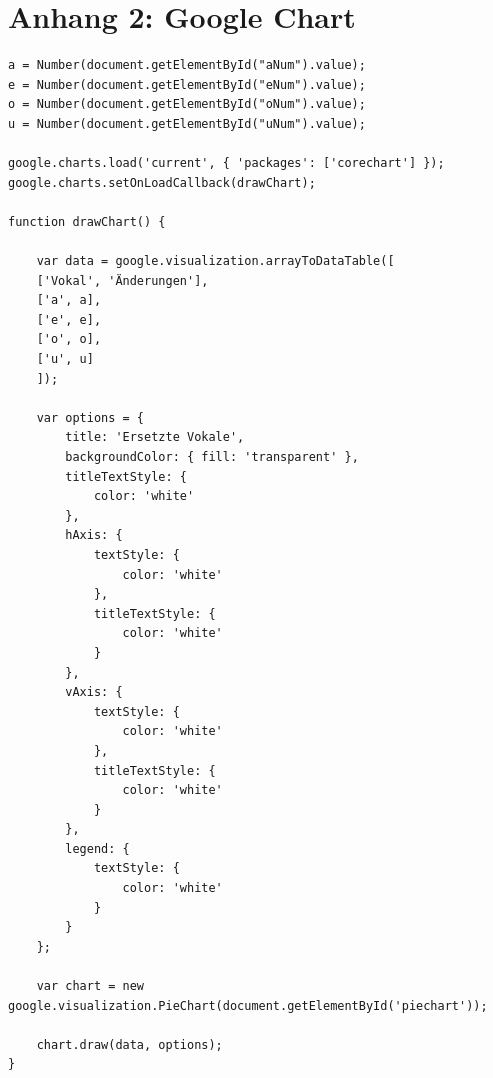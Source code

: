 \documentclass[a4paper,
12pt,
oneside]
{article}
\begin{document}
	\section*{Anhang 2: Google Chart}
	\begin{lstlisting}
a = Number(document.getElementById("aNum").value);
e = Number(document.getElementById("eNum").value);
o = Number(document.getElementById("oNum").value);
u = Number(document.getElementById("uNum").value);

google.charts.load('current', { 'packages': ['corechart'] });
google.charts.setOnLoadCallback(drawChart);

function drawChart() {

	var data = google.visualization.arrayToDataTable([
	['Vokal', 'Änderungen'],
	['a', a],
	['e', e],
	['o', o],
	['u', u]
	]);
	
	var options = {
		title: 'Ersetzte Vokale',
		backgroundColor: { fill: 'transparent' },
		titleTextStyle: {
			color: 'white'
		},
		hAxis: {
			textStyle: {
				color: 'white'
			},
			titleTextStyle: {
				color: 'white'
			}
		},
		vAxis: {
			textStyle: {
				color: 'white'
			},
			titleTextStyle: {
				color: 'white'
			}
		},
		legend: {
			textStyle: {
				color: 'white'
			}
		}
	};
	
	var chart = new google.visualization.PieChart(document.getElementById('piechart'));
	
	chart.draw(data, options);
}
	\end{lstlisting}
	\clearpage
	
	
	
	
	
\end{document}
